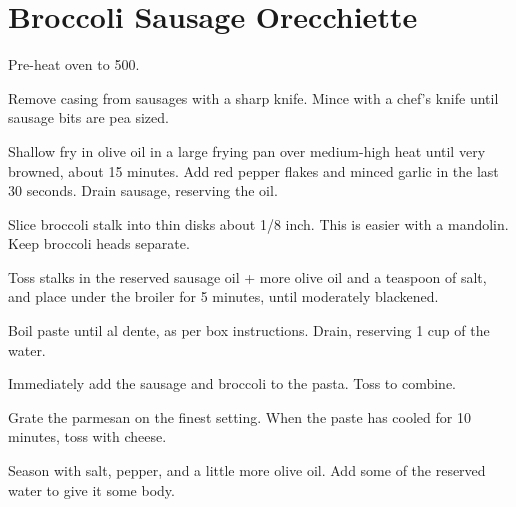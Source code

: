 \section{Broccoli Sausage Orecchiette}
\begin{recipe}



Pre-heat oven to 500\degree{}.

Remove casing from sausages with a sharp knife. Mince with a chef's knife until sausage bits are pea sized.

Shallow fry in olive oil in a large frying pan over medium-high heat until very browned, about 15 minutes.
Add red pepper flakes and minced garlic in the last 30 seconds. Drain sausage, reserving the oil.


Slice broccoli stalk into thin disks about 1/8 inch. This is easier with a mandolin. Keep broccoli heads separate.

Toss stalks in the reserved sausage oil + more olive oil and a teaspoon of salt, and place under the broiler for 5 minutes, until moderately blackened.


Boil paste until al dente, as per box instructions. Drain, reserving 1 cup of the water.

Immediately add the sausage and broccoli to the pasta. Toss to combine.


Grate the parmesan on the finest setting. When the paste has cooled for 10 minutes, toss with cheese.

Season with salt, pepper, and a little more olive oil. Add some of the reserved water to give it some body.


\end{recipe}
